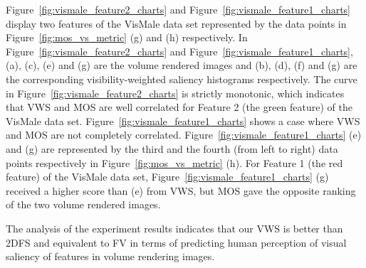 Figure~\ref{fig:vismale_feature2_charts} and Figure~\ref{fig:vismale_feature1_charts} display two features of the VisMale data set represented by the data points in Figure~\ref{fig:mos_vs_metric} (g) and (h) respectively.
In Figure~\ref{fig:vismale_feature2_charts} and Figure~\ref{fig:vismale_feature1_charts}, (a), (c), (e) and (g) are the volume rendered images and (b), (d), (f) and (g) are the corresponding visibility-weighted saliency histograms respectively.
The curve in Figure~\ref{fig:vismale_feature2_charts} is strictly monotonic, which indicates that VWS and MOS are well correlated for Feature 2 (the green feature) of the VisMale data set.
Figure~\ref{fig:vismale_feature1_charts} shows a case where VWS and MOS are not completely correlated. Figure~\ref{fig:vismale_feature1_charts} (e) and (g) are represented by the third and the fourth (from left to right) data points respectively in Figure~\ref{fig:mos_vs_metric} (h).
For Feature 1 (the red feature) of the VisMale data set, Figure~\ref{fig:vismale_feature1_charts} (g) received a higher score than (e) from VWS, but MOS gave the opposite ranking of the two volume rendered images.

The analysis of the experiment results indicates that our VWS is better than 2DFS and equivalent to FV in terms of predicting human perception of visual saliency of features in volume rendering images.

